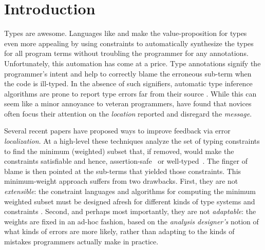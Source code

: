 \section{\textbf{Introduction}}
\label{sec:introduction}

%
Types are awesome.
%
Languages like \ocaml and \haskell make
the value-proposition for types even more
appealing by using constraints to automatically
synthesize the types for all program terms
without troubling the programmer for any
annotations.
%
Unfortunately, this automation has come at a price.
Type annotations signify
the programmer's intent and help to correctly
blame the erroneous sub-term when the code is
ill-typed.
%
In the absence of such signifiers, automatic
type inference algorithms are prone to report
type errors far from their source
\citep{Wand1986-nw}.
%
While this can seem like a minor annoyance to
veteran programmers, \citet{Joosten1993-yx} have found
that novices often focus their attention on the \emph{location}
reported and disregard the \emph{message}.

%
Several recent papers have proposed ways
to improve feedback via error \emph{localization}.
%
At a high-level these techniques analyze
the set of typing constraints to find
the minimum (weighted) subset that,
if removed, would make the constraints
satisfiable and hence, assertion-safe~\citep{Jose:2011}
or well-typed~\citep{Zhang2014-lv,Loncaric2016-uk,Chen2014-gd,Pavlinovic2014-mr}.
The finger of blame is then pointed at the
sub-terms that yielded those constraints.
%
This minimum-weight approach suffers
from two drawbacks.
%
First, they are not \emph{extensible}:
the constraint languages and algorithms for computing
the minimum weighted subset must be
designed afresh for different kinds
of type systems and constraints \citep{Loncaric2016-uk}.
%
Second, and perhaps most importantly,
they are not \emph{adaptable}: the
weights are fixed in an ad-hoc fashion, based on the
\emph{analysis designer's} notion
of what kinds of errors are more
likely, rather than
adapting to the kinds of mistakes
programmers actually make in practice.

